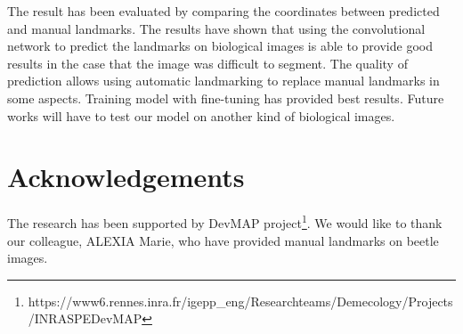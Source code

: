 \documentclass[10pt]{article}
\begin{document}
The result has been evaluated by comparing the coordinates between predicted and manual landmarks.  The results have shown that using the convolutional network to predict the landmarks on biological images is able to provide good results in the case that the image was difficult to segment. The quality of prediction allows using automatic landmarking to replace manual landmarks in some aspects. Training model with fine-tuning has provided best results. Future works will have to test our model on another kind of biological images.

\section*{Acknowledgements}
The research has been supported by DevMAP project\footnote{https://www6.rennes.inra.fr/igepp\_eng/Research\-teams/Demecology/Projects/INRA\-SPE\-DevMAP}. We would like to thank our colleague, ALEXIA Marie, who have provided manual landmarks on beetle images.


\end{document}
